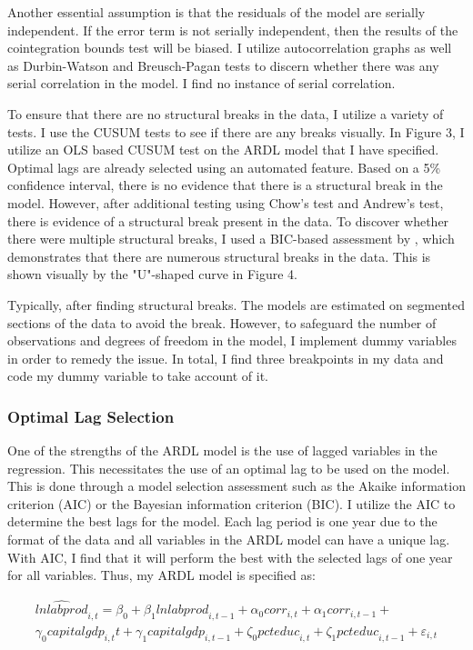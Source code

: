 \documentclass[12pt]{article} %
\begin{document}
Another essential assumption is that the residuals of the model are serially independent. If the error term is not serially independent, then the results of the cointegration bounds test will be biased. I utilize autocorrelation graphs as well as Durbin-Watson and Breusch-Pagan tests to discern whether there was any serial correlation in the model. I find no instance of serial correlation. 

To ensure that there are no structural breaks in the data, I utilize a variety of tests. I use the CUSUM tests to see if there are any breaks visually. In Figure 3, I utilize an OLS based CUSUM test on the ARDL model that I have specified. Optimal lags are already selected using an automated feature. Based on a 5\% confidence interval, there is no evidence  that there is a structural break in the model. However, after additional testing using Chow's test and Andrew's test, there is evidence of a structural break present in the data. To discover whether there were multiple structural breaks, I used a BIC-based assessment by \citet{jushan_bai_computation_2002}, which demonstrates that there are numerous structural breaks in the data. This is shown visually by the "U"-shaped curve in Figure 4. 

Typically, after finding structural breaks. The models are estimated on segmented sections of the data to avoid the break. However, to safeguard the number of observations and degrees of freedom in the model, I implement dummy variables in order to remedy the issue. In total, I find three breakpoints in my data and code my dummy variable to take account of it. 


\subsubsection*{Optimal Lag Selection}

One of the strengths of the ARDL model is the use of lagged variables in the regression. This necessitates the use of an optimal lag to be used on the model. This is done through a model selection assessment such as the Akaike information criterion (AIC) or the Bayesian information criterion (BIC). I utilize the AIC to determine the best lags for the model. Each lag period is one year due to the format of the data and all variables in the ARDL model can have a unique lag. With AIC, I find that it will perform the best with the selected lags of one year for all variables. 
Thus, my ARDL model is specified as: 

\begin{equation} \label{eu_eqn}
	\begin{aligned}
	\widehat{lnlabprod}_{i,t}= \beta_{0}+\beta_{1}{lnlabprod}_{i,t-1} +\alpha_0{corr}_{i,t} + \alpha_1{corr}_{i,t-1} +\\
	\gamma_0{capitalgdp}_{i,t}t+
	\gamma_1{capitalgdp}_{i,t-1} + \zeta_0{pcteduc}_{i,t}+\zeta_1{pcteduc}_{i,t-1} + \varepsilon_{i,t}
	\end{aligned}
\end{equation}
\end{document}

